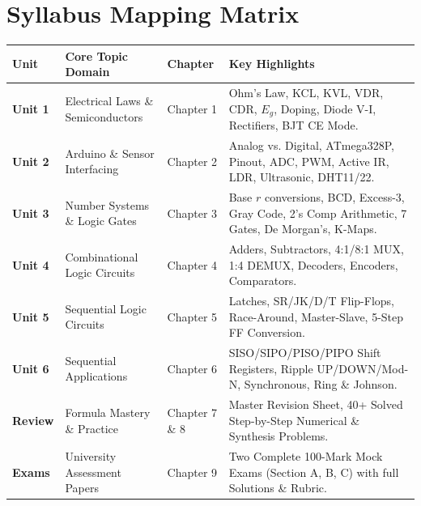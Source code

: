 \documentclass[a4paper,11pt,oneside,openany]{book}
\begin{document}
\section*{Syllabus Mapping Matrix}
\begin{table}[htbp]
\centering
\small
\begin{tabularx}{\textwidth}{lp{5.2cm}p{2.2cm}X}
\toprule
\textbf{Unit} & \textbf{Core Topic Domain} & \textbf{Chapter} & \textbf{Key Highlights} \\
\midrule
\textbf{Unit 1} & Electrical Laws \& Semiconductors & Chapter 1 & Ohm's Law, KCL, KVL, VDR, CDR, $E_g$, Doping, Diode V-I, Rectifiers, BJT CE Mode. \\
\addlinespace
\textbf{Unit 2} & Arduino \& Sensor Interfacing & Chapter 2 & Analog vs. Digital, ATmega328P, Pinout, ADC, PWM, Active IR, LDR, Ultrasonic, DHT11/22. \\
\addlinespace
\textbf{Unit 3} & Number Systems \& Logic Gates & Chapter 3 & Base $r$ conversions, BCD, Excess-3, Gray Code, 2's Comp Arithmetic, 7 Gates, De Morgan's, K-Maps. \\
\addlinespace
\textbf{Unit 4} & Combinational Logic Circuits & Chapter 4 & Adders, Subtractors, 4:1/8:1 MUX, 1:4 DEMUX, Decoders, Encoders, Comparators. \\
\addlinespace
\textbf{Unit 5} & Sequential Logic Circuits & Chapter 5 & Latches, SR/JK/D/T Flip-Flops, Race-Around, Master-Slave, 5-Step FF Conversion. \\
\addlinespace
\textbf{Unit 6} & Sequential Applications & Chapter 6 & SISO/SIPO/PISO/PIPO Shift Registers, Ripple UP/DOWN/Mod-N, Synchronous, Ring \& Johnson. \\
\addlinespace
\textbf{Review} & Formula Mastery \& Practice & Chapter 7 \& 8 & Master Revision Sheet, 40+ Solved Step-by-Step Numerical \& Synthesis Problems. \\
\addlinespace
\textbf{Exams} & University Assessment Papers & Chapter 9 & Two Complete 100-Mark Mock Exams (Section A, B, C) with full Solutions \& Rubric. \\
\bottomrule
\end{tabularx}
\end{table}

\clearpage

\tableofcontents
\cleardoublepage

\mainmatter










\end{document}

